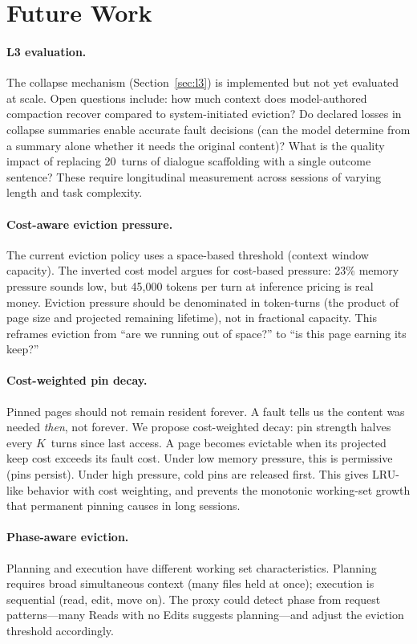 \section{Future Work}
\label{sec:future}

\paragraph{L3 evaluation.}
The collapse mechanism (Section~\ref{sec:l3}) is implemented but not
yet evaluated at scale. Open questions include: how much context does
model-authored compaction recover compared to system-initiated
eviction? Do declared losses in collapse summaries enable accurate
fault decisions (can the model determine from a summary alone whether
it needs the original content)? What is the quality impact of
replacing 20~turns of dialogue scaffolding with a single outcome
sentence? These require longitudinal measurement across sessions of
varying length and task complexity.

\paragraph{Cost-aware eviction pressure.}
The current eviction policy uses a space-based threshold (context
window capacity). The inverted cost model argues for cost-based
pressure: 23\% memory pressure sounds low, but 45{,}000 tokens per
turn at inference pricing is real money. Eviction pressure should be
denominated in token-turns (the product of page size and projected
remaining lifetime), not in fractional capacity. This reframes
eviction from ``are we running out of space?'' to ``is this page
earning its keep?''

\paragraph{Cost-weighted pin decay.}
Pinned pages should not remain resident forever. A fault tells us
the content was needed \emph{then}, not forever. We propose
cost-weighted decay: pin strength halves every $K$~turns since last
access. A page becomes evictable when its projected keep cost exceeds
its fault cost. Under low memory pressure, this is permissive
(pins persist). Under high pressure, cold pins are released first.
This gives LRU-like behavior with cost weighting, and prevents the
monotonic working-set growth that permanent pinning causes in long
sessions.

\paragraph{Phase-aware eviction.}
Planning and execution have different working set characteristics.
Planning requires broad simultaneous context (many files held at
once); execution is sequential (read, edit, move on). The proxy
could detect phase from request patterns---many Reads with no Edits
suggests planning---and adjust the eviction threshold accordingly.

